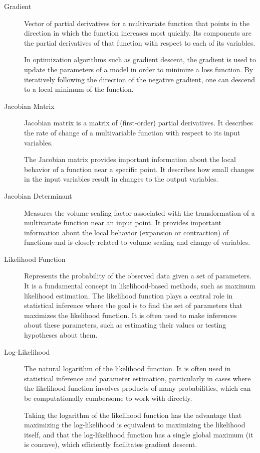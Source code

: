 \documentclass[a4paper]{report}
\begin{document}
\begin{description}
\item[Gradient]
Vector of partial derivatives for a multivariate function that points in the direction in which the function increases most quickly. Its components are the partial derivatives of that function with respect to each of its variables.

In optimization algorithms such as gradient descent, the gradient is used to update the parameters of a model in order to minimize a loss function. By iteratively following the direction of the negative gradient, one can descend to a local minimum of the function.

\item[Jacobian Matrix]
Jacobian matrix is a matrix of (first-order) partial derivatives. It describes the rate of change of a multivariable function with respect to its input variables. 

The Jacobian matrix provides important information about the local behavior of a function near a specific point. It describes how small changes in the input variables result in changes to the output variables.

\item[Jacobian Determinant]
Measures the volume scaling factor associated with the transformation of a multivariate function near an input point. It provides important information about the local behavior (expansion or contraction) of functions and is closely related to volume scaling and change of variables.

\item[Likelihood Function]
Represents the probability of the observed data given a set of parameters. It is a fundamental concept in likelihood-based methods, such as maximum likelihood estimation. The likelihood function plays a central role in statistical inference where the goal is to find the set of parameters that maximizes the likelihood function. It is often used to make inferences about these parameters, such as estimating their values or testing hypotheses about them.

\item[Log-Likelihood]
The natural logarithm of the likelihood function. It is often used in statistical inference and parameter estimation, particularly in cases where the likelihood function involves products of many probabilities, which can be computationally cumbersome to work with directly.

Taking the logarithm of the likelihood function has the advantage that maximizing the log-likelihood is equivalent to maximizing the likelihood itself, and that the log-likelihood function has a single global maximum (it is concave), which efficiently facilitates gradient descent.


\end{description}
\end{document}
